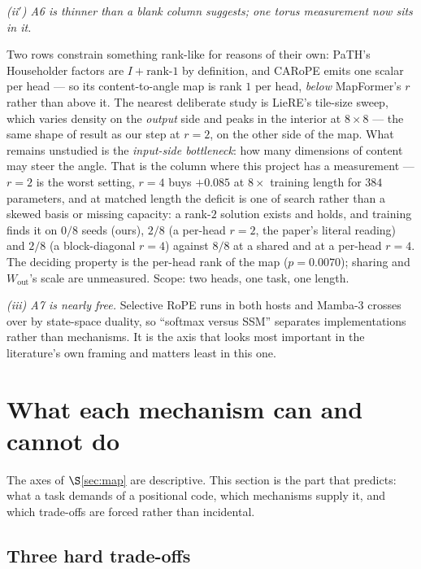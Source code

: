 \documentclass[11pt]{article}
\begin{document}
\emph{(ii$'$) A6 is thinner than a blank column suggests; one torus measurement now sits in it.}

Two rows
constrain something rank-like for reasons of their own: PaTH's Householder factors
are $I+\text{rank-}1$ by definition, and CARoPE emits one scalar per head --- so
its content-to-angle map is rank $1$ per head, \emph{below} MapFormer's $r$ rather
than above it. The nearest deliberate study is LieRE's tile-size sweep, which
varies density on the \emph{output} side and peaks in the interior at
$8\times8$ --- the same shape of result as our step at $r=2$, on the other side of
the map. What remains unstudied is the \emph{input-side bottleneck}: how many
dimensions of content may steer the angle. That is the column where this project
has a measurement --- $r=2$ is the worst setting, $r=4$ buys $+0.085$ at $8\times$
training length for $384$ parameters, and at matched length the deficit is one of
search rather than a skewed basis or missing capacity: a rank-$2$ solution exists
and holds, and training finds it on $0/8$ seeds (ours), $2/8$ (a per-head $r=2$,
the paper's literal reading) and $2/8$ (a block-diagonal $r=4$) against $8/8$ at a shared
and at a per-head $r=4$. The deciding property is the per-head rank of the map
($p=0.0070$); sharing and $W_{\mathrm{out}}$'s scale are unmeasured. Scope: two heads, one
task, one length.

\emph{(iii) A7 is nearly free.} Selective RoPE runs in both hosts and Mamba-3
crosses over by state-space duality, so ``softmax versus SSM'' separates
implementations rather than mechanisms. It is the axis that looks most important
in the literature's own framing and matters least in this one.

\section{What each mechanism can and cannot do}
\label{sec:capability}

The axes of $\S$\ref{sec:map} are descriptive. This section is the part that
predicts: what a task demands of a positional code, which mechanisms supply it, and
which trade-offs are forced rather than incidental.

\subsection{Three hard trade-offs}
\end{document}
